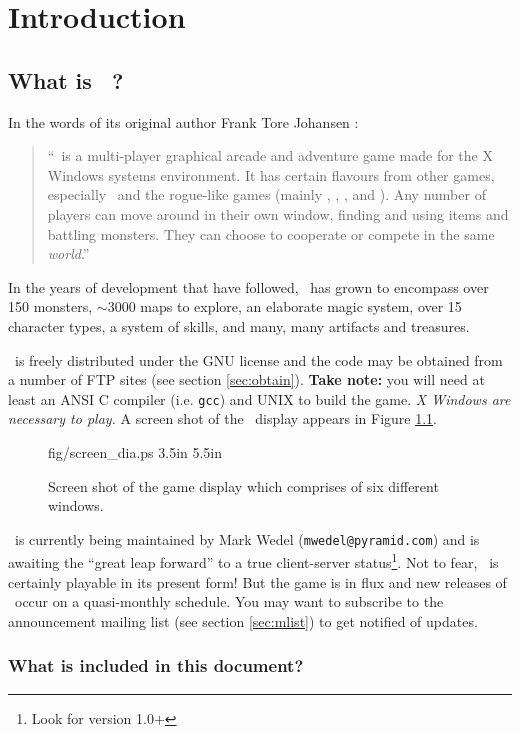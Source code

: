 
\chapter{Introduction}

\section{What is \cf\ ? }
 
In the words of its original author Frank Tore Johansen :
\begin{quote}
``\cf\ is a multi-player graphical arcade and adventure game made for the
X Windows systems environment. It has certain flavours from other games,
especially \gauntlet\ and the rogue-like  games (mainly \hack , \moria ,
\angband , and \ragnarok ). Any number of players can move around in their
own window, finding and using items and battling monsters. They can
choose to cooperate or compete in the same {\em world}.'' 
\end{quote}
In the years of development that have followed, \cf\ has grown to 
encompass over 150 monsters, $\sim$3000 maps to explore, an elaborate
magic system, over 15 character types, a system of skills, and
many, many artifacts and treasures. 

\cf\ is freely distributed under the GNU license and the code may be
obtained from a number of FTP sites (see section \ref{sec:obtain}).
{\bf Take note:} you will need at least an ANSI C compiler (i.e. {\tt gcc}) 
and UNIX to build the game.  {\em X Windows are necessary to play.} 
A screen shot of the \cf\ display appears in Figure \ref{fig:dis}.

\begin{figure}   
\mongovaryboth fig/screen_dia.ps 3.5in 5.5in
\caption{Screen shot of the game display which comprises of six
different windows. \label{fig:dis}}
\end{figure}

\cf\ is currently being maintained by Mark Wedel ({\tt mwedel@pyramid.com})
and is awaiting the ``great leap forward'' to a true client-server
status\footnote{Look for version 1.0$+$}. Not to fear, \cf\ is certainly 
playable in its present form!
But the game is in flux and new releases of \cf\ occur on a quasi-monthly
schedule. You may want to subscribe to the announcement mailing list
(see section \ref{sec:mlist}) to get notified of updates.

\subsection{What is included in this document?}  

